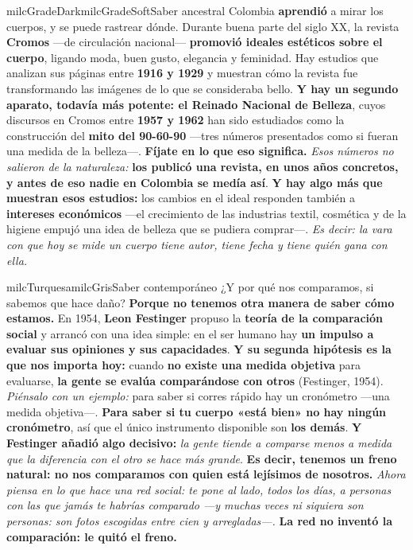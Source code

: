 \documentclass[11pt,letterpaper]{article}
\begin{document}
\begin{softbox}{milcGradeDark}{milcGradeSoft}{Saber ancestral}
Colombia \textbf{aprendió} a mirar los cuerpos, y se puede rastrear dónde. Durante buena parte del siglo XX, la revista \textbf{Cromos} ---de circulación nacional--- \textbf{promovió ideales estéticos sobre el cuerpo}, ligando moda, buen gusto, elegancia y feminidad. Hay estudios que analizan sus páginas entre \textbf{1916 y 1929} y muestran cómo la revista fue transformando las imágenes de lo que se consideraba bello. \textbf{Y hay un segundo aparato, todavía más potente: el Reinado Nacional de Belleza}, cuyos discursos en Cromos entre \textbf{1957 y 1962} han sido estudiados como la construcción del \textbf{mito del 90-60-90} ---tres números presentados como si fueran una medida de la belleza---. \textbf{Fíjate en lo que eso significa.} \emph{Esos números no salieron de la naturaleza:} \textbf{los publicó una revista, en unos años concretos, y antes de eso nadie en Colombia se medía así}. \textbf{Y hay algo más que muestran esos estudios:} los cambios en el ideal responden también a \textbf{intereses económicos} ---el crecimiento de las industrias textil, cosmética y de la higiene empujó una idea de belleza que se pudiera comprar---. \emph{Es decir: la vara con que hoy se mide un cuerpo tiene autor, tiene fecha y tiene quién gana con ella.}
\end{softbox}

\begin{softbox}{milcTurquesa}{milcGris}{Saber contemporáneo}
¿Y por qué nos comparamos, si sabemos que hace daño? \textbf{Porque no tenemos otra manera de saber cómo estamos.} En 1954, \textbf{Leon Festinger} propuso la \textbf{teoría de la comparación social} y arrancó con una idea simple: en el ser humano hay \textbf{un impulso a evaluar sus opiniones y sus capacidades}. \textbf{Y su segunda hipótesis es la que nos importa hoy:} cuando \textbf{no existe una medida objetiva} para evaluarse, \textbf{la gente se evalúa comparándose con otros} (Festinger, 1954). \emph{Piénsalo con un ejemplo:} para saber si corres rápido hay un cronómetro ---una medida objetiva---. \textbf{Para saber si tu cuerpo «está bien» no hay ningún cronómetro}, así que el único instrumento disponible son \textbf{los demás}. \textbf{Y Festinger añadió algo decisivo:} \emph{la gente tiende a comparse menos a medida que la diferencia con el otro se hace más grande}. \textbf{Es decir, tenemos un freno natural: no nos comparamos con quien está lejísimos de nosotros.} \emph{Ahora piensa en lo que hace una red social: te pone al lado, todos los días, a personas con las que jamás te habrías comparado ---y muchas veces ni siquiera son personas: son fotos escogidas entre cien y arregladas---.} \textbf{La red no inventó la comparación: le quitó el freno.}
\end{softbox}
\end{document}
